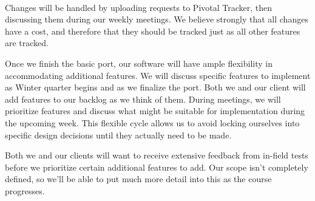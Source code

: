\paragraph{}Changes will be handled by uploading requests to Pivotal Tracker, then discussing them during our weekly meetings. We believe strongly that all changes have a cost, and therefore that they should be tracked just as all other features are tracked. 

Once we finish the basic port, our software will have ample flexibility in accommodating additional features. We will discuss specific features to implement as Winter quarter begins and as we finalize the port. Both we and our client will add features to our backlog as we think of them. During meetings, we will prioritize features and discuss what might be suitable for implementation during the upcoming week. This flexible cycle allows us to avoid locking ourselves into specific design decisions until they actually need to be made. 

Both we and our clients will want to receive extensive feedback from in-field tests before we prioritize certain additional features to add. Our scope isn’t completely defined, so we’ll be able to put much more detail into this as the course progresses. 
